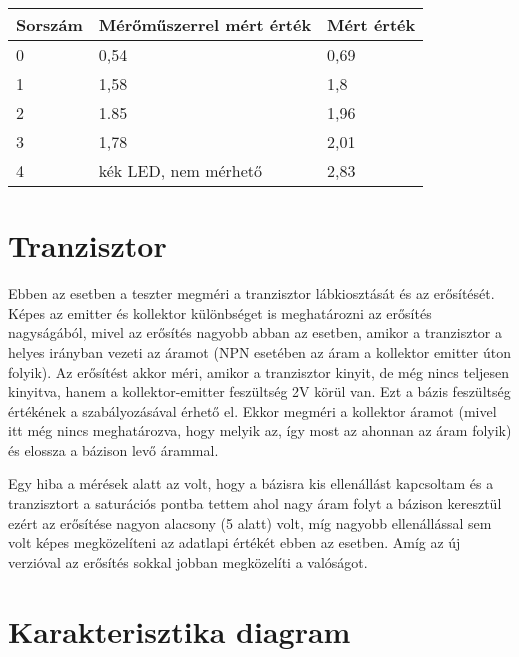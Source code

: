 \begin{table}[H]
    \begin{tabular}{lll}
    Sorszám                 & Mérőműszerrel mért érték                  & Mért érték                \\ \hline
    \multicolumn{1}{|l|}{0} & \multicolumn{1}{l|}{0,54}                 & \multicolumn{1}{l|}{0,69} \\ \hline
    \multicolumn{1}{|l|}{1} & \multicolumn{1}{l|}{1,58}                 & \multicolumn{1}{l|}{1,8}  \\ \hline
    \multicolumn{1}{|l|}{2} & \multicolumn{1}{l|}{1.85}                 & \multicolumn{1}{l|}{1,96} \\ \hline
    \multicolumn{1}{|l|}{3} & \multicolumn{1}{l|}{1,78}                 & \multicolumn{1}{l|}{2,01} \\ \hline
    \multicolumn{1}{|l|}{4} & \multicolumn{1}{l|}{kék LED, nem mérhető} & \multicolumn{1}{l|}{2,83} \\ \hline
\end{tabular}
\end{table}

\section{Tranzisztor}

Ebben az esetben a teszter megméri a tranzisztor lábkiosztását és az erősítését.
Képes az emitter és kollektor különbséget is meghatározni az erősítés nagyságából,
mivel az erősítés nagyobb abban az esetben, amikor a tranzisztor a helyes irányban
vezeti az áramot (NPN esetében az áram a kollektor emitter úton folyik).
Az erősítést akkor méri, amikor a tranzisztor kinyit, de még nincs teljesen kinyitva,
hanem a kollektor-emitter feszültség 2V körül van. Ezt a bázis feszültség
értékének a szabályozásával érhető el. Ekkor megméri a kollektor áramot
(mivel itt még nincs meghatározva, hogy melyik az, így most az ahonnan
az áram folyik) és elossza a bázison levő árammal.

Egy hiba a mérések alatt az volt, hogy a bázisra kis ellenállást
kapcsoltam és a tranzisztort a saturációs pontba tettem ahol 
nagy áram folyt a bázison keresztül ezért az erősítése nagyon alacsony
(5 alatt) volt, míg nagyobb ellenállással sem volt képes megközelíteni
az adatlapi értékét ebben az esetben. Amíg az új verzióval az 
erősítés sokkal jobban megközelíti a valóságot.

\section{Karakterisztika diagram}


